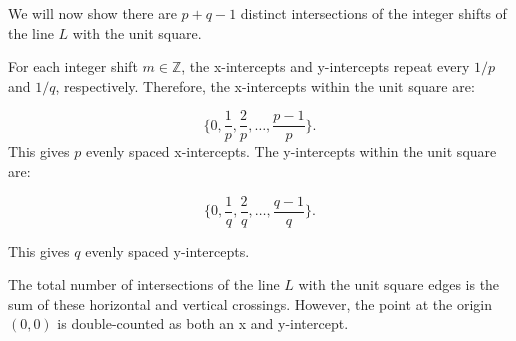 \documentclass[11pt]{article}
\begin{document}
We will now show there are \(p+q-1\)  distinct intersections of the integer shifts of the line \(L\) with the unit square.

For each integer shift \(m \in \mathbb{Z}\), the x-intercepts and y-intercepts repeat every \(1/p\) and \(1/q\), respectively. Therefore, the x-intercepts within the unit square are:

\[
   \{0, \frac{1}{p}, \frac{2}{p}, \dots, \frac{p-1}{p}\}.
   \]
This gives \(p\) evenly spaced x-intercepts. The y-intercepts within the unit square are:

\[
   \{0, \frac{1}{q}, \frac{2}{q}, \dots, \frac{q-1}{q}\}.
   \]

This gives \(q\) evenly spaced y-intercepts.

The total number of intersections of the line \(L\) with the unit square edges is the sum of these horizontal and vertical crossings. However, the point at the origin \((0,0)\) is double-counted as both an x and y-intercept.
\end{document}
